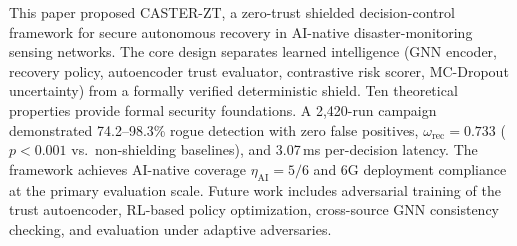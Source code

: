 \documentclass[lettersize,journal]{IEEEtran}
\begin{document}
This paper proposed CASTER-ZT, a zero-trust shielded decision-control framework for secure autonomous recovery in AI-native disaster-monitoring sensing networks.
The core design separates learned intelligence (GNN encoder, recovery policy, autoencoder trust evaluator, contrastive risk scorer, MC-Dropout uncertainty) from a formally verified deterministic shield.
Ten theoretical properties provide formal security foundations.
A 2,420-run campaign demonstrated 74.2--98.3\% rogue detection with zero false positives, $\omega_{\mathrm{rec}}=0.733$ ($p<0.001$ vs.\ non-shielding baselines), and 3.07\,ms per-decision latency.
The framework achieves AI-native coverage $\eta_{\mathrm{AI}}=5/6$ and 6G deployment compliance at the primary evaluation scale.
Future work includes adversarial training of the trust autoencoder, RL-based policy optimization, cross-source GNN consistency checking, and evaluation under adaptive adversaries.





\end{document}
